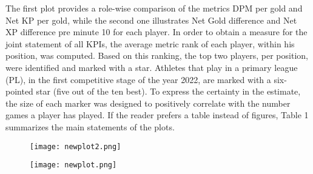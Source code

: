 \documentclass{article}
\begin{document}
The first plot provides a role-wise comparison of the metrics DPM per gold and Net KP per gold, while the second one illustrates Net Gold difference and Net XP difference pre minute 10 for each player. In order to obtain a measure for the joint statement of all KPIs, the average metric rank of each player, within his position, was computed. Based on this ranking, the top two players, per position, were identified and marked with a star. Athletes that play in a primary league (PL), in the first competitive stage of the year 2022, are marked with a six-pointed star (five out of the ten best). To express the certainty in the estimate, the size of each marker was designed to positively correlate with the number games a player has played. If the reader prefers a table instead of figures, Table 1 summarizes the main statements of the plots.
\begin{figure}[H]
\texttt{[image: newplot2.png]}

\end{figure}
\begin{figure}[H]
\texttt{[image: newplot.png]}

\end{figure}
\end{document}
